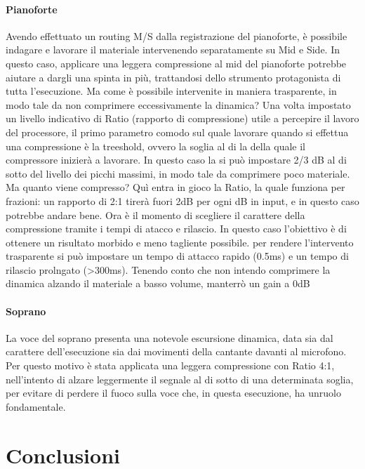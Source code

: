 		\paragraph{Pianoforte} Avendo effettuato un routing M/S dalla registrazione del pianoforte, è possibile indagare e lavorare il materiale intervenendo separatamente su Mid e Side. In questo caso, applicare una leggera compressione al mid del pianoforte potrebbe aiutare a dargli una spinta in più, trattandosi dello strumento protagonista di tutta l'esecuzione. Ma come è possibile intervenite in maniera trasparente, in modo tale da non comprimere eccessivamente la dinamica? Una volta impostato un livello indicativo di Ratio (rapporto di compressione) utile a percepire il lavoro del processore, il primo parametro comodo sul quale lavorare quando si effettua una compressione è la treeshold, ovvero la soglia al di la della quale il compressore inizierà a lavorare. In questo caso la si può impostare 2/3 dB al di sotto del livello dei picchi massimi, in modo tale da comprimere poco materiale. Ma quanto viene compresso? Quì entra in gioco la Ratio, la quale funziona per frazioni: un rapporto di 2:1 tirerà fuori 2dB per ogni dB in input, e in questo caso potrebbe andare bene.
		Ora è il momento di scegliere il carattere della compressione tramite i tempi di atacco e rilascio. In questo caso l'obiettivo è di ottenere un risultato morbido e meno tagliente possibile. per rendere l'intervento trasparente si può impostare un tempo di attacco rapido (0.5ms) e un tempo di rilascio prolngato (>300ms).
		Tenendo conto che non intendo comprimere la dinamica alzando il materiale a basso volume, manterrò un gain a 0dB
		
		\paragraph{Soprano} La voce del soprano presenta una notevole escursione dinamica, data sia dal carattere dell'esecuzione sia dai movimenti della cantante davanti al microfono. Per questo motivo è stata applicata una leggera compressione con Ratio 4:1, nell'intento di alzare leggermente il segnale al di sotto di una determinata soglia, per evitare di perdere il fuoco sulla voce che, in questa esecuzione, ha unruolo fondamentale.
	
\section{Conclusioni}

